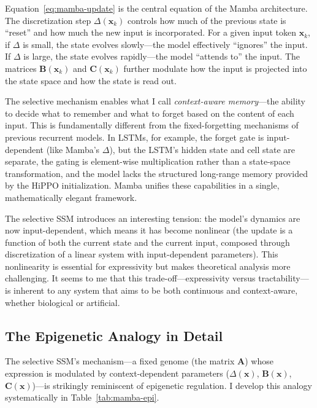 \documentclass[12pt,a4paper]{article}
\renewcommand{\vec}[1]{\mathbf{#1}}
\begin{document}
Equation~\eqref{eq:mamba-update} is the central equation of the Mamba architecture. The discretization step $\Delta(\vec{x}_k)$ controls how much of the previous state is ``reset'' and how much the new input is incorporated. For a given input token $\vec{x}_k$, if $\Delta$ is small, the state evolves slowly---the model effectively ``ignores'' the input. If $\Delta$ is large, the state evolves rapidly---the model ``attends to'' the input. The matrices $\mathbf{B}(\vec{x}_k)$ and $\mathbf{C}(\vec{x}_k)$ further modulate how the input is projected into the state space and how the state is read out.

The selective mechanism enables what I call \emph{context-aware memory}---the ability to decide what to remember and what to forget based on the content of each input. This is fundamentally different from the fixed-forgetting mechanisms of previous recurrent models. In LSTMs, for example, the forget gate is input-dependent (like Mamba's $\Delta$), but the LSTM's hidden state and cell state are separate, the gating is element-wise multiplication rather than a state-space transformation, and the model lacks the structured long-range memory provided by the HiPPO initialization. Mamba unifies these capabilities in a single, mathematically elegant framework.

The selective SSM introduces an interesting tension: the model's dynamics are now input-dependent, which means it has become nonlinear (the update is a function of both the current state and the current input, composed through discretization of a linear system with input-dependent parameters). This nonlinearity is essential for expressivity but makes theoretical analysis more challenging. It seems to me that this trade-off---expressivity versus tractability---is inherent to any system that aims to be both continuous and context-aware, whether biological or artificial.

\subsection{The Epigenetic Analogy in Detail}
\label{sec:mamba-epi}

The selective SSM's mechanism---a fixed genome (the matrix $\mathbf{A}$) whose expression is modulated by context-dependent parameters ($\Delta(\vec{x})$, $\mathbf{B}(\vec{x})$, $\mathbf{C}(\vec{x})$)---is strikingly reminiscent of epigenetic regulation. I develop this analogy systematically in Table~\ref{tab:mamba-epi}.
\end{document}
